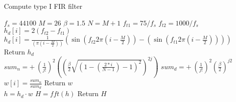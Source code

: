 \begin{algorithm}[H]
\caption{Compute type I FIR filter}
\label{alg:FIR}
\begin{algorithmic}[1] 
\State $f_s= 44100$ 
\State $M = 26$  
\State $\beta = 1.5$ 
\State $N = M+1$ 
\State $f_{t1} = 75/f_s$ 
\State $f_{t2} = 1000/f_s$ 
\\
        		\State $h_d[i] = 2(f_{t2} - f_{t1})$
        	\Else 
        		\State  $h_d[i] = \frac{1}{ (\pi (i - \frac{M}{2}))}(\sin(f_{t2} 2 \pi (i - \frac{M}{2})) - (\sin(f_{t1} 2 \pi (i - \frac{M}{2}))))$ 
        	\EndIf 
	\EndFor
	\State Return $h_d$
\EndProcedure
\\
			\State $ sum_n = + \ (\frac{1}{j!})^2 \left( \left( \frac{\beta}{2} \sqrt{\left(1 - \left( \frac{2*i}{N-1}\right) - 1\right)^2}\right)^{2j}\right)$
			\State $ sum_d = + \ (\frac{1}{j!})^2 \left( \frac{\beta}{2}\right)^{j2}$
		\EndFor
		\State $w[i]=\frac{sum_n}{sum_d}$
	\EndFor
	\State Return $w$
\EndProcedure
\\
	\State $h = h_d \cdot w$ 
	\State $H = fft(h)$ 
	\State Return $H$
\EndProcedure

\end{algorithmic}
\end{algorithm}